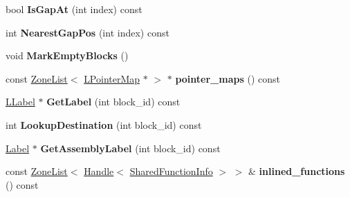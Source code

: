 \begin{DoxyCompactItemize}
\item 
bool {\bfseries Is\+Gap\+At} (int index) const \hypertarget{classv8_1_1internal_1_1_l_chunk_a2ae7ddcd72ac3437877090e22c1c1091}{}\label{classv8_1_1internal_1_1_l_chunk_a2ae7ddcd72ac3437877090e22c1c1091}

\item 
int {\bfseries Nearest\+Gap\+Pos} (int index) const \hypertarget{classv8_1_1internal_1_1_l_chunk_ac5d9348d24f2b528a49ba23c05097b1d}{}\label{classv8_1_1internal_1_1_l_chunk_ac5d9348d24f2b528a49ba23c05097b1d}

\item 
void {\bfseries Mark\+Empty\+Blocks} ()\hypertarget{classv8_1_1internal_1_1_l_chunk_a2ac3d03a7d2a00d21641da256a94f4b3}{}\label{classv8_1_1internal_1_1_l_chunk_a2ac3d03a7d2a00d21641da256a94f4b3}

\item 
const \hyperlink{classv8_1_1internal_1_1_zone_list}{Zone\+List}$<$ \hyperlink{classv8_1_1internal_1_1_l_pointer_map}{L\+Pointer\+Map} $\ast$ $>$ $\ast$ {\bfseries pointer\+\_\+maps} () const \hypertarget{classv8_1_1internal_1_1_l_chunk_a0e2745acc31d2df4290fff8fa433920c}{}\label{classv8_1_1internal_1_1_l_chunk_a0e2745acc31d2df4290fff8fa433920c}

\item 
\hyperlink{classv8_1_1internal_1_1_l_label}{L\+Label} $\ast$ {\bfseries Get\+Label} (int block\+\_\+id) const \hypertarget{classv8_1_1internal_1_1_l_chunk_a791820389ac663c9b3d5768ab5ac7699}{}\label{classv8_1_1internal_1_1_l_chunk_a791820389ac663c9b3d5768ab5ac7699}

\item 
int {\bfseries Lookup\+Destination} (int block\+\_\+id) const \hypertarget{classv8_1_1internal_1_1_l_chunk_a83f3293fd4a47051344878204c0a25dd}{}\label{classv8_1_1internal_1_1_l_chunk_a83f3293fd4a47051344878204c0a25dd}

\item 
\hyperlink{classv8_1_1internal_1_1_label}{Label} $\ast$ {\bfseries Get\+Assembly\+Label} (int block\+\_\+id) const \hypertarget{classv8_1_1internal_1_1_l_chunk_a9c0e43f44b076f85e30f1c9af1953b2c}{}\label{classv8_1_1internal_1_1_l_chunk_a9c0e43f44b076f85e30f1c9af1953b2c}

\item 
const \hyperlink{classv8_1_1internal_1_1_zone_list}{Zone\+List}$<$ \hyperlink{classv8_1_1internal_1_1_handle}{Handle}$<$ \hyperlink{classv8_1_1internal_1_1_shared_function_info}{Shared\+Function\+Info} $>$ $>$ \& {\bfseries inlined\+\_\+functions} () const \hypertarget{classv8_1_1internal_1_1_l_chunk_a0450e0ec1ac4268c31dba750c1a2e968}{}\label{classv8_1_1internal_1_1_l_chunk_a0450e0ec1ac4268c31dba750c1a2e968}


\end{DoxyCompactItemize}

